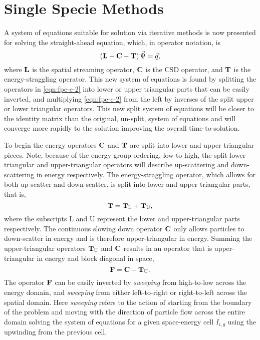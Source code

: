 \section{Single Specie Methods}
A system of equations suitable for solution via iterative methods is now presented for solving the straight-ahead equation,
which, in operator notation, is 
%
\begin{equation} 
  \label{eqn:fpe-e-2}
  \left(\bA{L} - \bA{C} - \bA{T} \right) \vec{\Psi} = \vec{q},
\end{equation}
%
where $\mathbf{L}$ is the spatial streaming operator, $\mathbf{C}$ is the CSD operator,
and $\mathbf{T}$ is the energy-straggling operator.
This new system of equations is found by splitting the operators in \ref{eqn:fpe-e-2}
into lower or upper triangular parts that can be easily inverted, and multiplying \ref{eqn:fpe-e-2} from the left by inverses of the split upper or lower triangular operators. This new split system of equations will be closer to the identity matrix
than the original, un-split, system of equations and will converge more rapidly to the solution improving the overall time-to-solution.

To begin the energy operators $\mathbf{C}$ and $\mathbf{T}$ are split into lower and upper triangular pieces. Note, because of the energy group ordering, low to high, the split lower-triangular and upper-triangular operators will describe up-scattering and down-scattering in energy respectively. The energy-straggling operator, which allows for both up-scatter and down-scatter, is split into lower and upper triangular parts, that is,
\[
  \mathbf{T} = \mathbf{T}_{\text{L}} + \mathbf{T}_{\text{U}},
\]
where the subscripts L and U represent the lower and upper-triangular parts respectively. The continuous slowing down operator $\mathbf{C}$ only allows particles to down-scatter in energy and is therefore upper-triangular in energy. Summing the upper-triangular operators $\mathbf{T}_{\text{U}}$ and $\mathbf{C}$ results in an operator that is upper-triangular in energy and block diagonal in space,
\[
  \mathbf{F} = \mathbf{C} + \mathbf{T}_{\text{U}}.
\]
The operator $\mathbf{F}$ can be easily inverted by \emph{sweeping} from high-to-low across the energy domain, and \emph{sweeping} from either left-to-right or right-to-left across the spatial domain. Here \emph{sweeping} refers to the action of starting from the boundary of the problem and moving with the direction of particle flow across the entire domain solving the system of equations for a given space-energy cell $I_{i,g}$ using the upwinding from the previous cell.

